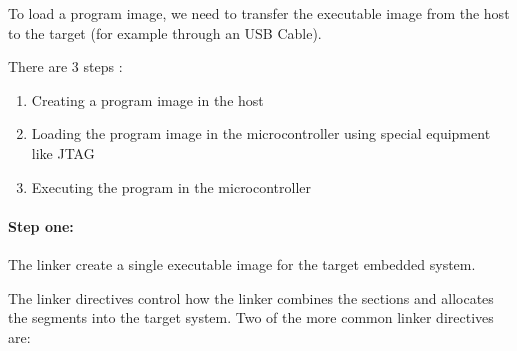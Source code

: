 To load a program image, we need to transfer the executable image from the host to the target (for example through an USB Cable).

There are 3 steps :

\begin{enumerate}
    \item Creating a program image in the host
    \item Loading the program image in the microcontroller using special equipment like JTAG
    \item Executing the program in the microcontroller
\end{enumerate}


\paragraph{Step one: } The linker create a single executable image for the target embedded system. 

The linker directives control how the linker combines the sections and allocates the segments into the
target system. 
Two of the more common linker directives are:

